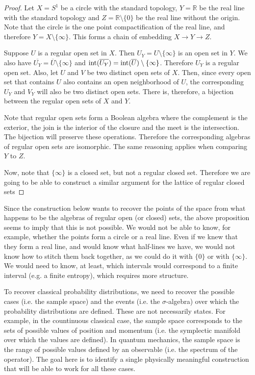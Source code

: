 \begin{proof}
	Let $X=S^1$ be a circle with the standard topology, $Y=\mathbb{R}$ be the real line with the standard topology and $Z=\mathbb{R}\setminus \{0\}$ be the real line without the origin. Note that the circle is the one point compactification of the real line, and therefore $Y=X\setminus \{\infty\}$. This forms a chain of embedding $X \to Y \to Z$.
	
	Suppose $U$ is a regular open set in $X$. Then $U_Y = U \setminus \{\infty\}$ is an open set in $Y$. We also have $\overline{U_Y} = \overline{U} \setminus \{\infty\}$ and $\operatorname{int}(\overline{U_Y}) = \operatorname{int}(\overline{U}) \setminus \{\infty\}$. Therefore $U_Y$ is a regular open set. Also, let $U$ and $V$ be two distinct open sets of $X$. Then, since every open set that contains $U$ also contains an open neighborhood of $U$, the corresponding $U_Y$ and $V_Y$ will also be two distinct open sets. There is, therefore, a bijection between the regular open sets of $X$ and $Y$.

	Note that regular open sets form a Boolean algebra where the complement is the exterior, the join is the interior of the closure and the meet is the intersection. The bijection will preserve these operations. Therefore the corresponding algebras of regular open sets are isomorphic. The same reasoning applies when comparing $Y$ to $Z$.
	
	Now, note that $\{\infty\}$ is a closed set, but not a regular closed set. Therefore we are going to be able to construct a similar argument for the lattice of regular closed sets
\end{proof}

\begin{remark}
	Since the construction below wants to recover the points of the space from what happens to be the algebras of regular open (or closed) sets, the above proposition seems to imply that this is not possible. We would not be able to know, for example, whether the points form a circle or a real line. Even if we knew that they form a real line, and would know what half-lines we have, we would not know how to stitch them back together, as we could do it with $\{0\}$ or with $\{\infty\}$. We would need to know, at least, which intervals would correspond to a finite interval (e.g. a finite entropy), which requires more structure.
\end{remark}

To recover classical probability distributions, we need to recover the possible cases (i.e. the sample space) and the events (i.e. the $\sigma$-algebra) over which the probability distributions are defined. These are not necessarily states. For example, in the countinuous classical case, the sample space corresponds to the sets of possible values of position and momentum (i.e. the symplectic manifold over which the values are defined). In quantum mechanics, the sample space is the range of possible values defined by an observable (i.e. the spectrum of the operator). The goal here is to identify a single physically meaningful construction that will be able to work for all these cases.

